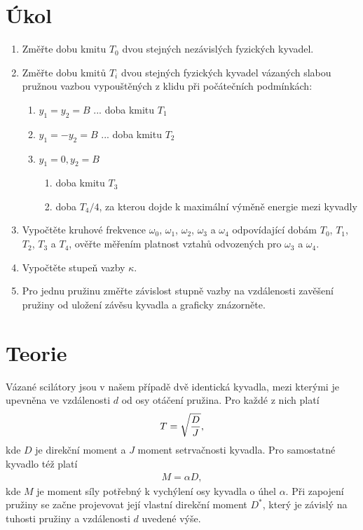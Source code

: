 \documentclass[a4paper,12pt]{article}
\begin{document}
%  
\section{Úkol}
\begin{enumerate}
	\item Změřte dobu kmitu $T_0$ dvou stejných nezávislých fyzických kyvadel.
	\item Změřte dobu kmitů $T_i$ dvou stejných fyzických kyvadel vázaných slabou pružnou vazbou vypouštěných z klidu při počátečních podmínkách:
	\begin{enumerate}
		\item	$y_1=y_2=B$ ... doba kmitu $T_1$
		\item $y_1=-y_2= B$ ... doba kmitu $T_2$
		\item $y_1=0, y_2= B$
		\begin{enumerate}
			\item doba kmitu $T_3$
			\item doba $T_4/4$, za kterou dojde k maximální výměně energie mezi kyvadly 
		\end{enumerate}
	\end{enumerate}
	\item Vypočtěte kruhové frekvence $\omega_0$, $\omega_1$, $\omega_2$, $\omega_3$ a $\omega_4$ odpovídající dobám $T_0$, $T_1$, $T_2$, $T_3$ a $T_4$, ověřte měřením platnost vztahů odvozených pro $\omega_3$ a $\omega_4$.
	\item Vypočtěte stupeň vazby $\kappa$.
	\item Pro jednu pružinu změřte závislost stupně vazby na vzdálenosti zavěšení pružiny od uložení závěsu kyvadla a graficky znázorněte. 
\end{enumerate}

\section{Teorie}
\noindent
Vázané scilátory jsou v našem případě dvě identická kyvadla, mezi kterými je upevněna ve vzdálenosti $d$ od osy otáčení pružina. Pro každé z nich platí
\begin{eqnarray}
	T=\sqrt{{D \over J}},
\end{eqnarray}
kde $D$ je direkční moment a $J$ moment setrvačnosti kyvadla. Pro samostatné kyvadlo též platí
\begin{eqnarray}
	M=\alpha D,
\end{eqnarray}
kde $M$ je moment síly potřebný k vychýlení osy kyvadla o úhel $\alpha$. Při zapojení pružiny se začne projevovat její vlastní direkční moment $D^*$, který je závislý na tuhosti pružiny a vzdálenosti $d$ uvedené výše.
\end{document}
